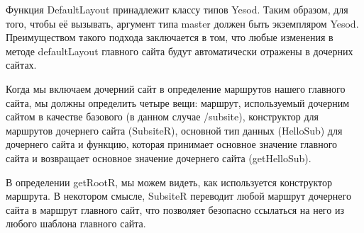 Функция DefaultLayout принадлежит классу типов Yesod. Таким образом, для того, чтобы её вызывать, аргумент типа master должен быть экземпляром Yesod. Преимуществом такого подхода заключается в том, что любые изменения в методе defaultLayout главного сайта будут автоматически отражены в дочерних сайтах.

Когда мы включаем дочерний сайт в определение маршрутов нашего главного сайта, мы должны определить четыре вещи: маршрут, используемый дочерним сайтом в качестве базового (в данном случае /subsite), конструктор для маршрутов дочернего сайта (SubsiteR), основной тип данных (HelloSub) для дочернего сайта и функцию, которая принимает основное значение главного сайта и возвращает основное значение дочернего сайта (getHelloSub).

В определении getRootR, мы можем видеть, как используется конструктор маршрута. В некотором смысле, SubsiteR переводит любой маршрут дочернего сайта в маршрут главного сайт, что позволяет безопасно ссылаться на него из любого шаблона главного сайта.
